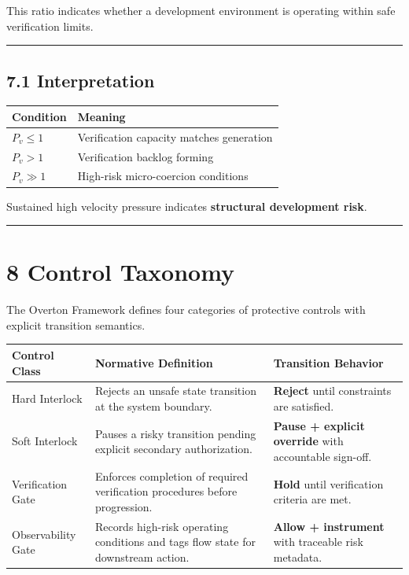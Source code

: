 \documentclass[
]{article}
\newcounter{none} %
\begin{document}
This ratio indicates whether a development environment is operating
within safe verification limits.

\begin{center}\rule{0.5\linewidth}{0.5pt}\end{center}

\subsection{7.1 Interpretation}\label{71-interpretation}

{\def\LTcaptype{none} %
\begin{longtable}[]{@{}ll@{}}
\toprule\noalign{}
Condition & Meaning \\
\midrule\noalign{}
\endhead
\bottomrule\noalign{}
\endlastfoot
\(P_v \le 1\) & Verification capacity matches generation \\
\(P_v > 1\) & Verification backlog forming \\
\(P_v \gg 1\) & High-risk micro-coercion conditions \\
\end{longtable}
}

Sustained high velocity pressure indicates \textbf{structural
development risk}.

\begin{center}\rule{0.5\linewidth}{0.5pt}\end{center}

\section{8 Control Taxonomy}\label{8-control-taxonomy}

The Overton Framework defines four categories of protective controls
with explicit transition semantics.

{\def\LTcaptype{none} %
\begin{longtable}[]{@{}lll@{}}
\toprule\noalign{}
Control Class & Normative Definition & Transition Behavior \\
\midrule\noalign{}
\endhead
\bottomrule\noalign{}
\endlastfoot
Hard Interlock & Rejects an unsafe state transition at the system
boundary. & \textbf{Reject} until constraints are satisfied. \\
Soft Interlock & Pauses a risky transition pending explicit secondary
authorization. & \textbf{Pause + explicit override} with accountable
sign-off. \\
Verification Gate & Enforces completion of required verification
procedures before progression. & \textbf{Hold} until verification
criteria are met. \\
Observability Gate & Records high-risk operating conditions and tags
flow state for downstream action. & \textbf{Allow + instrument} with
traceable risk metadata. \\
\end{longtable}
}
\end{document}
